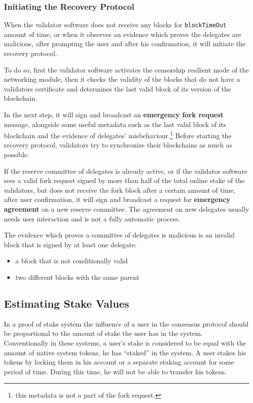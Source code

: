 \subsubsection{Initiating the Recovery Protocol}

When the validator software does not receive any blocks for \texttt{blockTimeOut} amount of time, or when it observes an
evidence which proves the delegates are malicious, after prompting the user and after his confirmation, it will
initiate the recovery protocol.

To do so, first the validator software activates the censorship resilient mode of the networking module, then it checks
the validity of the blocks that do not have a validators certificate and determines the last valid block of its
version of the blockchain.

In the next step, it will sign and broadcast an \textbf{emergency fork request} message, alongside some useful metadata
such as the last valid block of its blockchain and the evidence of delegates' misbehaviour.\footnote{this metadata is
not a part of the fork request.} Before starting the recovery protocol, validators try to synchronize their blockchains
as much as possible.

If the reserve committee of delegates is already active, or if the validator software sees a valid fork request signed
by more than half of the total online stake of the validators, but does not receive the fork
block after a certain amount of time, after user confirmation, it will sign and broadcast a request for
\textbf{emergency agreement} on a new reserve committee. The agreement on new delegates usually needs user
interaction and is not a fully automatic process.

The evidence which proves a committee of delegates is malicious is an invalid block that is signed by at least
one delegate:
\begin{itemize}
    \item a block that is not conditionally valid
    \item two different blocks with the same parent
\end{itemize}

\subsection{Estimating Stake Values}\label{subsec:user's-stake}

In a proof of stake system the influence of a user in the consensus protocol should be proportional to the amount
of stake the user has in the system. Conventionally in these systems, a user's stake is considered to be equal with the
amount of native system tokens, he has ``staked'' in the system. A user stakes his tokens by locking them in
his account or a separate staking account for some period of time. During this time, he will not be able to transfer
his tokens.

